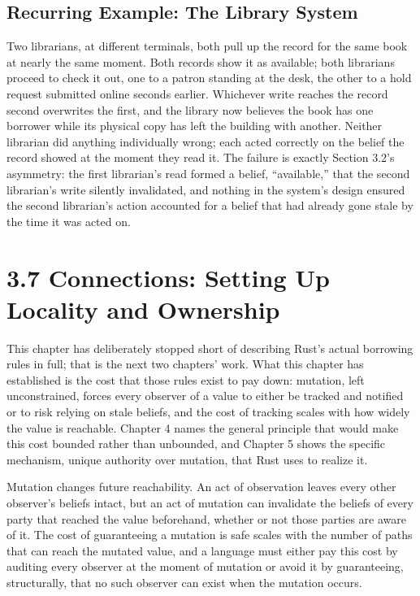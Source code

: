 \documentclass[11pt]{book}
\begin{document}
\subsection*{Recurring Example: The Library System}

Two librarians, at different terminals, both pull up the record for the same book at nearly the same moment. Both records show it as available; both librarians proceed to check it out, one to a patron standing at the desk, the other to a hold request submitted online seconds earlier. Whichever write reaches the record second overwrites the first, and the library now believes the book has one borrower while its physical copy has left the building with another. Neither librarian did anything individually wrong; each acted correctly on the belief the record showed at the moment they read it. The failure is exactly Section 3.2's asymmetry: the first librarian's read formed a belief, ``available,'' that the second librarian's write silently invalidated, and nothing in the system's design ensured the second librarian's action accounted for a belief that had already gone stale by the time it was acted on.

\section*{3.7 Connections: Setting Up Locality and Ownership}

This chapter has deliberately stopped short of describing Rust's actual borrowing rules in full; that is the next two chapters' work. What this chapter has established is the cost that those rules exist to pay down: mutation, left unconstrained, forces every observer of a value to either be tracked and notified or to risk relying on stale beliefs, and the cost of tracking scales with how widely the value is reachable. Chapter 4 names the general principle that would make this cost bounded rather than unbounded, and Chapter 5 shows the specific mechanism, unique authority over mutation, that Rust uses to realize it.

\begin{invariantbox}
Mutation changes future reachability. An act of observation leaves every other observer's beliefs intact, but an act of mutation can invalidate the beliefs of every party that reached the value beforehand, whether or not those parties are aware of it. The cost of guaranteeing a mutation is safe scales with the number of paths that can reach the mutated value, and a language must either pay this cost by auditing every observer at the moment of mutation or avoid it by guaranteeing, structurally, that no such observer can exist when the mutation occurs.
\end{invariantbox}
\end{document}
